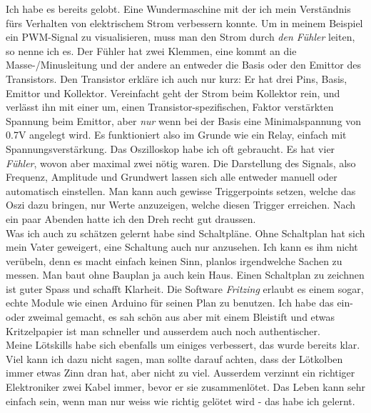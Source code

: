 \documentclass[12pt,titlepage,a4paper]{article}
\begin{document}
Ich habe es bereits gelobt. Eine Wundermaschine mit der ich mein Verständnis fürs Verhalten von elektrischem Strom verbessern konnte. Um in meinem Beispiel ein PWM-Signal zu visualisieren, muss man den Strom durch \textit{den Fühler} leiten, so nenne ich es. Der Fühler hat zwei Klemmen, eine kommt an die Masse-/Minusleitung und der andere an entweder die Basis oder den Emittor des Transistors. Den Transistor erkläre ich auch nur kurz: Er hat drei Pins, Basis, Emittor und Kollektor. Vereinfacht geht der Strom beim Kollektor rein, und verlässt ihn mit einer um, einen Transistor-spezifischen, Faktor verstärkten Spannung beim Emittor, aber \textit{nur} wenn bei der Basis eine Minimalspannung von 0.7V angelegt wird. Es funktioniert also im Grunde wie ein Relay, einfach mit Spannungsverstärkung. Das Oszilloskop habe ich oft gebraucht. Es hat vier \textit{Fühler}, wovon aber maximal zwei nötig waren. Die Darstellung des Signals, also Frequenz, Amplitude und Grundwert lassen sich alle entweder manuell oder automatisch einstellen. Man kann auch gewisse Triggerpoints setzen, welche das Oszi dazu bringen, nur Werte anzuzeigen, welche diesen Trigger erreichen. Nach ein paar Abenden hatte ich den Dreh recht gut draussen.\\Was ich auch zu schätzen gelernt habe sind Schaltpläne. Ohne Schaltplan hat sich mein Vater geweigert, eine Schaltung auch nur anzusehen. Ich kann es ihm nicht verübeln, denn es macht einfach keinen Sinn, planlos irgendwelche Sachen zu messen. Man baut ohne Bauplan ja auch kein Haus. Einen Schaltplan zu zeichnen ist guter Spass und schafft Klarheit. Die Software \textit{Fritzing } erlaubt es einem sogar, echte Module wie einen Arduino für seinen Plan zu benutzen. Ich habe das ein- oder zweimal gemacht, es sah schön aus aber mit einem Bleistift und etwas Kritzelpapier ist man schneller und ausserdem auch noch authentischer.\\Meine Lötskills habe sich ebenfalls um einiges verbessert, das wurde bereits klar. Viel kann ich dazu nicht sagen, man sollte darauf achten, dass der Lötkolben immer etwas Zinn dran hat, aber nicht zu viel. Ausserdem verzinnt ein richtiger Elektroniker zwei Kabel immer, bevor er sie zusammenlötet. Das Leben kann sehr einfach sein, wenn man nur weiss wie richtig gelötet wird - das habe ich gelernt.
\end{document}
